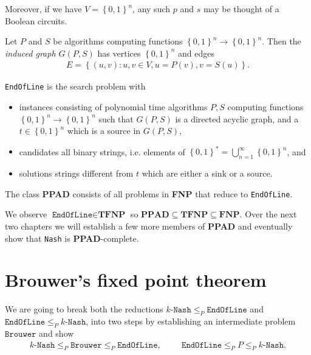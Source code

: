 \documentclass{article}
\begin{document}
Moreover, if we have $V=\left\lbrace{0,1}\right\rbrace^n$,
any such $p$ and $s$ may be thought of a Boolean circuits.

\begin{definition}
  Let $P$ and $S$ be algorithms computing functions
  $\left\lbrace{0,1}\right\rbrace^n\to\left\lbrace{0,1}\right\rbrace^n$.
  Then the \emph{induced graph $G(P,S)$} has vertices $\left\lbrace{0,1}\right\rbrace^n$
  and edges
  \begin{align*}
    E = \left\lbrace{(u,v) : u,v\in V, u=P(v), v=S(u)}\right\rbrace.
  \end{align*}
\end{definition}

\begin{definition}
  \texttt{EndOfLine} is the search problem with
  \begin{itemize}
    \item instances consisting of polynomial time algorithms $P,S$
      computing functions $\left\lbrace{0,1}\right\rbrace^n\to\left\lbrace{0,1}\right\rbrace^n$ such that
      $G(P,S)$ is a directed acyclic graph, and a
      $t\in\left\lbrace{0,1}\right\rbrace^n$ which is a source in $G(P,S)$,
    \item candidates all binary strings, i.e. elements of
      $\left\lbrace{0,1}\right\rbrace^* = \bigcup_{n=1}^\infty \left\lbrace{0,1}\right\rbrace^n$, and
    \item solutions strings different from $t$ which are either a sink or
      a source.
  \end{itemize}
\end{definition}

\begin{definition}
  The class \textbf{PPAD} consists of all problems in \textbf{FNP}
  that reduce to \texttt{EndOfLine}.
\end{definition}

We observe $\texttt{EndOfLine}\in\textbf{TFNP}$ so
$\textbf{PPAD}\subseteq\textbf{TFNP}\subseteq\textbf{FNP}$.
Over the next two chapters we will establish a few more members
of \textbf{PPAD} and eventually show that \texttt{Nash} is
\textbf{PPAD}-complete.

\section{Brouwer's fixed point theorem}

We are going to break both the reductions
$k\texttt{-Nash}\leq_P\texttt{EndOfLine}$ and
$\texttt{EndOfLine}\leq_P k\texttt{-Nash}$, into two steps by
establishing an intermediate problem $\texttt{Brouwer}$ and show
\begin{align*}
  k\texttt{-Nash}\leq_P\texttt{Brouwer}\leq_P\texttt{EndOfLine},
  \hspace{1cm}
  \texttt{EndOfLine}\leq_P P\leq_P k\texttt{-Nash}.
\end{align*}
\end{document}
